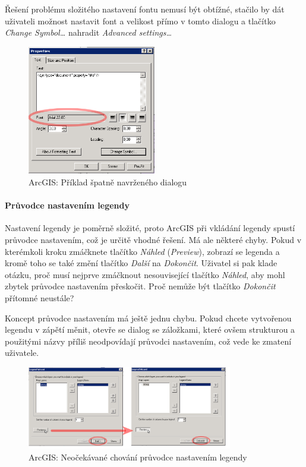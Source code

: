 \documentclass[a4paper,12pt,draft]{article}
\begin{document}
Řešení problému složitého nastavení fontu nemusí být obtížné,
stačilo by dát uživateli možnost nastavit font a velikost přímo v
tomto dialogu a tlačítko \emph{Change Symbol\ldots} nahradit \emph{Advanced
settings\ldots}

\begin{figure}[h!]
    \centering
    \includegraphics[width=0.5\textwidth]{./GUI_screenshots/ArcGIS_text_dialog.png}
    \caption{ArcGIS: Příklad špatně navrženého dialogu}
    \label{fig:ArcGIS_text_dialog}
\end{figure}

\paragraph*{Průvodce nastavením legendy}  Nastavení legendy je poměrně
složité, proto ArcGIS při vkládání legendy spustí průvodce nastavením,
což je určitě vhodné řešení. Má ale některé chyby. Pokud v
kterémkoli kroku zmáčknete tlačítko \emph{Náhled} (\emph{Preview}),
zobrazí se legenda a kromě toho se také změní tlačítko \emph{Další}
na \emph{Dokončit}. Uživatel si pak klade otázku, proč musí nejprve
zmáčknout nesouvisející tlačítko \emph{Náhled}, aby mohl zbytek
průvodce nastavením přeskočit. Proč nemůže být tlačítko
\emph{Dokončit} přítomné neustále?

Koncept průvodce nastavením má ještě jednu chybu. Pokud chcete vytvořenou
legendu v zápětí měnit, otevře se dialog se záložkami, které ovšem
strukturou a použitými názvy příliš neodpovídají průvodci nastavením,
což vede ke zmatení uživatele.

\begin{figure}[h!]
\centering
\includegraphics[width=0.8\textwidth]{./GUI_screenshots/ArcGIS_legend_wizard.png}
\caption{ArcGIS: Neočekávané chování průvodce nastavením legendy}
\label{fig:ArcGIS_legend_wizard}
\end{figure}
\end{document}
